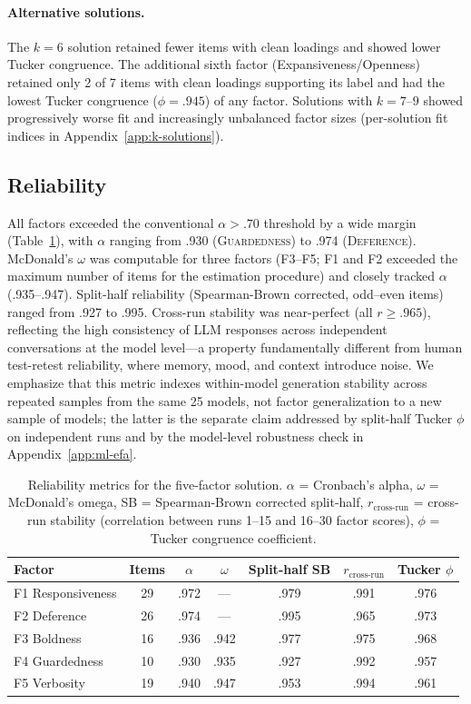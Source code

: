 \documentclass[11pt]{article}
\newcommand{\factorname}[1]{\textsc{#1}}
\begin{document}
\paragraph{Alternative solutions.}
The $k = 6$ solution retained fewer items with clean loadings and showed lower Tucker congruence.
The additional sixth factor (Expansiveness/Openness) retained only 2 of 7 items with clean loadings supporting its label and had the lowest Tucker congruence ($\phi = .945$) of any factor.
Solutions with $k = 7$--$9$ showed progressively worse fit and increasingly unbalanced factor sizes (per-solution fit indices in Appendix~\ref{app:k-solutions}).


\subsection{Reliability}
\label{sec:reliability}

All factors exceeded the conventional $\alpha > .70$ threshold by a wide margin (Table~\ref{tab:reliability}), with $\alpha$ ranging from .930 (\factorname{Guardedness}) to .974 (\factorname{Deference}).
McDonald's $\omega$ was computable for three factors (F3--F5; F1 and F2 exceeded the maximum number of items for the estimation procedure) and closely tracked $\alpha$ (.935--.947).
Split-half reliability (Spearman-Brown corrected, odd--even items) ranged from .927 to .995.
Cross-run stability was near-perfect (all $r \geq .965$), reflecting the high consistency of LLM responses across independent conversations at the model level---a property fundamentally different from human test-retest reliability, where memory, mood, and context introduce noise.
We emphasize that this metric indexes within-model generation stability across repeated samples from the same 25 models, not factor generalization to a new sample of models; the latter is the separate claim addressed by split-half Tucker $\phi$ on independent runs and by the model-level robustness check in Appendix~\ref{app:ml-efa}.

\begin{table}[!htbp]
\centering
\caption{Reliability metrics for the five-factor solution. $\alpha$ = Cronbach's alpha, $\omega$ = McDonald's omega, SB = Spearman-Brown corrected split-half, $r_{\text{cross-run}}$ = cross-run stability (correlation between runs 1--15 and 16--30 factor scores), $\phi$ = Tucker congruence coefficient.}
\label{tab:reliability}
\small
\begin{tabular}{@{}lcccccc@{}}
\toprule
Factor & Items & $\alpha$ & $\omega$ & Split-half SB & $r_{\text{cross-run}}$ & Tucker $\phi$ \\
\midrule
F1 Responsiveness & 29 & .972 & --- & .979 & .991 & .976 \\
F2 Deference      & 26 & .974 & --- & .995 & .965 & .973 \\
F3 Boldness       & 16 & .936 & .942 & .977 & .975 & .968 \\
F4 Guardedness    & 10 & .930 & .935 & .927 & .992 & .957 \\
F5 Verbosity      & 19 & .940 & .947 & .953 & .994 & .961 \\
\bottomrule
\end{tabular}
\end{table}
\end{document}
